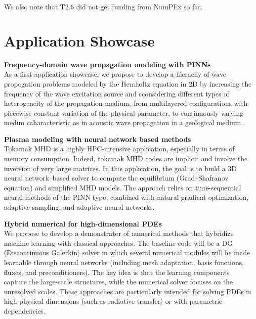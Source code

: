 We also note that T2.6  did not get funding from NumPEx so far.

\section{Application Showcase}
% 
%  

\textbf{Frequency-domain wave propagation modeling with PINNs} \\

As a first  application showcase, we propose to develop  a hierachy of
wave propagation  problems modeled by  the Hemholtz equation in  2D by
increasing   the  frequency   of  the   wave  excitation   source  and
cconsidering  different  types  of heterogeneity  of  the  propagation
medium,  from  multilayered  configurations  with  piecewise  constant
variation  of the  physical parameter,  to continuously  varying medim
caharacteristic  as  in  acoustic  wave propagation  in  a  geological
medium.

\textbf{Plasma modeling with neural network based methods }\\

Tokamak MHD is a highly HPC-intensive application, especially in terms
of  memory consumption.  Indeed, tokamak  MHD codes  are implicit  and
involve the inversion of very large matrices. In this application, the
goal  is to  build a  3D neural  network–based solver  to compute  the
equilibrium (Grad–Shafranov  equation) and simplified MHD  models. The
approach relies  on time-sequential neural  methods of the  PINN type,
combined with  natural gradient  optimization, adaptive  sampling, and
adaptive neural networks.

\textbf{Hybrid numerical for high-dimensional PDEs}\\

We  propose  to  develop  a demonstrator  of  numerical  methods  that
hybridize  machine learning  with classical  approaches. The  baseline
code will  be a  DG (Discontinuous Galerkin)  solver in  which several
numerical  modules  will be  made  learnable  through neural  networks
(including   mesh    adaptation,   basis   functions,    fluxes,   and
preconditioners). The key idea is that the learning components capture
the large-scale structures, while the  numerical solver focuses on the
unresolved  scales. These  approaches  are  particularly intended  for
solving PDEs in high physical  dimensions (such as radiative transfer)
or with parametric dependencies.

